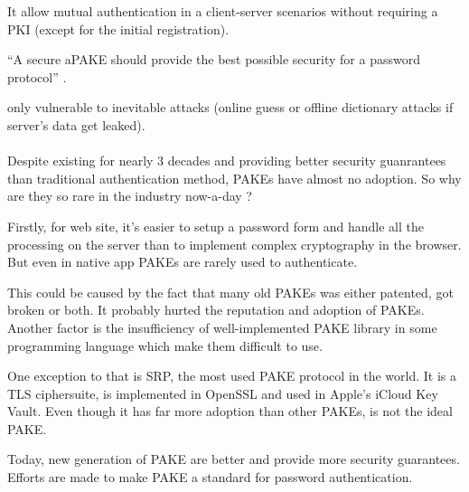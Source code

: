 \documentclass[../report.tex]{subfiles}
\begin{document}
It allow mutual authentication in a client-server scenarios without requiring a PKI (except for the initial registration).

``A secure aPAKE should provide the best possible security for a password protocol'' \cite{OPAQUE_Standard_Draft}.

only vulnerable to inevitable attacks (online guess or offline dictionary attacks if server's data get leaked).

\paragraph{}






Despite existing for nearly 3 decades and providing better security guanrantees than traditional authentication method, PAKEs have almost no adoption. So why are they so rare in the industry now-a-day ?

Firstly, for web site, it's easier to setup a password form and handle all the processing on the server than to implement complex cryptography in the browser. But even in native app PAKEs are rarely used to authenticate.

This could be caused by the fact that many old PAKEs was either patented, got broken or both. %
It probably hurted the reputation and adoption of PAKEs.
Another factor is the insufficiency of well-implemented PAKE library in some programming language %
which make them difficult to use.

One exception to that is SRP, the most used PAKE protocol in the world. %
 It is a TLS ciphersuite, is implemented in OpenSSL and used in Apple's iCloud Key Vault. Even though it has far more adoption than other PAKEs, is not the ideal PAKE.


Today, new generation of PAKE are better and provide more security guarantees. Efforts are made to make PAKE a standard for password authentication. %



\end{document}
